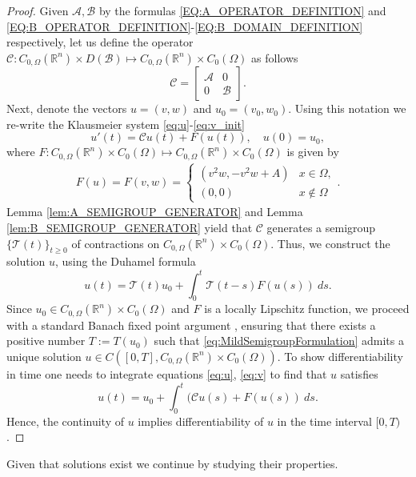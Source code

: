 \documentclass[11pt, a4paper]{article}
\theoremstyle{break}
\theoremstyle{break}
\theoremstyle{break}
\theoremstyle{break}
\theoremstyle{break}
\theoremstyle{break}
\theoremstyle{break}
\theoremstyle{break}
\theoremstyle{break}
\begin{document}
\begin{proof}
    Given $\mathcal{A}, \mathcal{B}$ by the formulas \eqref{EQ:A_OPERATOR_DEFINITION} and \eqref{EQ:B_OPERATOR_DEFINITION}-\eqref{EQ:B_DOMAIN_DEFINITION} respectively, let us define the operator $\mathcal{C}: C_{0, \Omega}(\mathbb{R}^n) \times D(\mathcal{B}) \mapsto C_{0, \Omega}(\mathbb{R}^n) \times C_0(\Omega)$ as follows
    \begin{equation}
        \mathcal{C} = 
        \begin{bmatrix}
            \mathcal{A} & 0\\ 0 & \mathcal{B}
        \end{bmatrix}.
    \end{equation}
    Next, denote the vectors $u = (v, w)$ and $u_0 = (v_0, w_0)$. Using this notation we re-write the Klausmeier system \eqref{eq:u}-\eqref{eq:v_init} 
    \begin{equation}
        \label{eq:ClassicalSemigroupFormulation}
         u'(t) = \mathcal{C} u(t) + F(u(t)), \quad u(0) = u_0,
    \end{equation}
    where  $F: C_{0, \Omega}(\mathbb{R}^n) \times C_0(\Omega) \mapsto C_{0, \Omega}(\mathbb{R}^n) \times C_0(\Omega)$ is given by
    \begin{align}
        F(u) = F(v, w) = 
        \begin{cases}
            (v^2 w, -v^2 w + A) &x \in \Omega, \\
            (0, 0) &x \notin \Omega
        \end{cases}.
    \end{align}
    Lemma \ref{lem:A_SEMIGROUP_GENERATOR} and Lemma \ref{lem:B_SEMIGROUP_GENERATOR} yield that $\mathcal{C}$ generates a semigroup $\{\mathcal{T}(t)\}_{t \geq 0}$ of contractions on $C_{0, \Omega}(\mathbb{R}^n) \times C_0(\Omega)$. Thus, we construct the solution $u$, using the Duhamel formula \cite[Lemma 4.1.1.]{cazenave1998introduction}
    \begin{equation}
        \label{eq:MildSemigroupFormulation}
         u(t) = \mathcal{T}(t) u_0 + \int_0^t \mathcal{T}(t-s) F(u(s)) \:ds.
    \end{equation}
    Since $u_0 \in C_{0, \Omega}(\mathbb{R}^n) \times C_0(\Omega)$ and $F$ is a locally Lipschitz function, we proceed with a standard Banach fixed point argument \cite[Proposition 4.3.3.]{cazenave1998introduction}, ensuring that there exists a positive number $T := T(u_0)$ such that \eqref{eq:MildSemigroupFormulation} admits a unique solution $u \in C\left([0, T], C_{0, \Omega}(\mathbb{R}^n) \times C_0(\Omega)\right)$. To show differentiability in time one needs to integrate equations \eqref{eq:u}, \eqref{eq:v} to find that $u$ satisfies
    \begin{equation}
        \label{eq:IntegralFormula}
        u(t) = u_0 + \int_0^t (\mathcal{C}u(s) + F(u(s)) \:ds.
    \end{equation}
    Hence, the continuity of $u$ implies differentiability of $u$ in the time interval $[0, T)$.
\end{proof}
Given that solutions exist we continue by studying their properties. 
\end{document}
